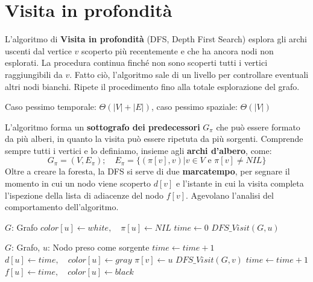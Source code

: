 \section{Visita in profondità}
L'algoritmo di \textbf{Visita in profondità} (DFS, Depth First Search) esplora gli archi uscenti dal vertice $v$ scoperto più recentemente e che ha ancora nodi non esplorati. La procedura continua finché non sono scoperti tutti i vertici raggiungibili da $v$. Fatto ciò, l'algoritmo sale di un livello per controllare eventuali altri nodi bianchi. Ripete il procedimento fino alla totale esplorazione del grafo. \begin{center}
	Caso pessimo temporale: $\Theta(|V| + |E|)$, caso pessimo spaziale: $\Theta(|V|)$
\end{center}
\noindent L'algoritmo forma un \textbf{sottografo dei predecessori} $G_\pi$ che può essere formato da più alberi, in quanto la visita può essere ripetuta da più sorgenti. Comprende sempre tutti i vertici e lo definiamo, insieme agli \textbf{archi d'albero}, come: \[G_\pi = (V, E_\pi);\quad E_\pi = \{(\pi[v], v) | v\in V \text{ e } \pi[v]\neq NIL\}\]
\noindent Oltre a creare la foresta, la DFS si serve di due \textbf{marcatempo}, per segnare il momento in cui un nodo viene scoperto $d[v]$ e l'istante in cui la visita completa l'ispezione della lista di adiacenze del nodo $f[v]$. Agevolano l'analisi del comportamento dell'algoritmo.
\begin{algorithm}[h]
	\caption{DFS(G)}
	\begin{algorithmic}[i]
		\Require $G$: Grafo
		 
		\State $color[u]\gets white,\quad \pi[u]\gets NIL$
		\EndFor
		\State $time\gets 0$ 
		\State
		 
		 
		\State $DFS\_Visit(G, u)$
		\EndIf
		\EndFor
	\end{algorithmic}
\end{algorithm}
\begin{algorithm}[h]
	\caption{DFS\_Visit(G, u)}
	\begin{algorithmic}[i]
		\Require $G$: Grafo, $u$: Nodo preso come sorgente
		\State $time\gets time+1$ 
		\State $d[u]\gets time,\quad color[u]\gets gray$ 
		\State
		 
		 
		\State $\pi[v]\gets u$
		\State $DFS\_Visit(G, v)$ 
		\EndIf
		\EndFor
		\State
		\State $time\gets time+1$
		\State $f[u]\gets time,\quad color[u]\gets black$ 
	\end{algorithmic}
\end{algorithm}


